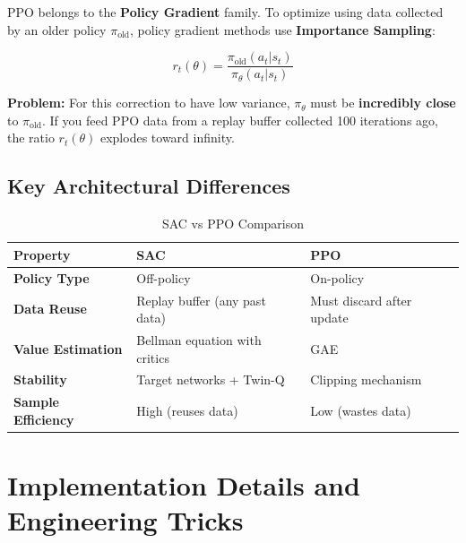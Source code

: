 \documentclass[12pt,a4paper]{article}
\theoremstyle{noteplain}
\theoremstyle{noteexercise}
\begin{document}
PPO belongs to the \textbf{Policy Gradient} family. To optimize using data collected by an older policy $\pi_{\text{old}}$, policy gradient methods use \textbf{Importance Sampling}:

$$r_t(\theta) = \frac{\pi_{\text{old}}(a_t|s_t)}{\pi_\theta(a_t|s_t)}$$

\textbf{Problem:} For this correction to have low variance, $\pi_\theta$ must be \textbf{incredibly close} to $\pi_{\text{old}}$. If you feed PPO data from a replay buffer collected 100 iterations ago, the ratio $r_t(\theta)$ explodes toward infinity.



\subsection{Key Architectural Differences}\label{ssec:diff-summary}



\begin{table}[H]
  \centering
  \caption{SAC vs PPO Comparison}
  \label{tab:sac-vs-ppo}
  \begin{tabular}{m{3.5cm}m{4cm}m{4cm}}
    \toprule
    \textbf{Property} & \textbf{SAC} & \textbf{PPO} \\
    \midrule
    \textbf{Policy Type} & Off-policy & On-policy \\
    \midrule
    \textbf{Data Reuse} & Replay buffer (any past data) & Must discard after update \\
    \midrule
    \textbf{Value Estimation} & Bellman equation with critics & GAE \\
    \midrule
    \textbf{Stability} & Target networks + Twin-Q & Clipping mechanism \\
    \midrule
    \textbf{Sample Efficiency} & High (reuses data) & Low (wastes data) \\
    \bottomrule
  \end{tabular}
\end{table}






\section{Implementation Details and Engineering Tricks}\label{sec:impl}
\end{document}
